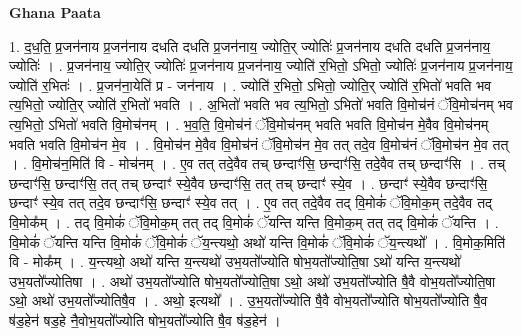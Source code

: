 \documentclass[17pt]{extarticle}
\begin{document}
\textbf{Ghana Paata } \newline

1. द॒ध॒ति॒ प्र॒जन॑नाय प्र॒जन॑नाय दधति दधति प्र॒जन॑नाय॒ ज्योति॒र् ज्योतिः॑ प्र॒जन॑नाय दधति दधति प्र॒जन॑नाय॒ ज्योतिः॑ । . प्र॒जन॑नाय॒ ज्योति॒र् ज्योतिः॑ प्र॒जन॑नाय प्र॒जन॑नाय॒ ज्योति॑ र॒भितो॒ ऽभितो॒ ज्योतिः॑ प्र॒जन॑नाय प्र॒जन॑नाय॒ ज्योति॑ र॒भितः॑ । . प्र॒जन॑ना॒येति॑ प्र - जन॑नाय । . ज्योति॑ र॒भितो॒ ऽभितो॒ ज्योति॒र् ज्योति॑ र॒भितो॑ भवति भव त्य॒भितो॒ ज्योति॒र् ज्योति॑ र॒भितो॑ भवति । . अ॒भितो॑ भवति भव त्य॒भितो॒ ऽभितो॑ भवति वि॒मोच॑नं ॅवि॒मोच॑नम् भव त्य॒भितो॒ ऽभितो॑ भवति वि॒मोच॑नम् । . भ॒व॒ति॒ वि॒मोच॑नं ॅवि॒मोच॑नम् भवति भवति वि॒मोच॑न मे॒वैव वि॒मोच॑नम् भवति भवति वि॒मोच॑न मे॒व । . वि॒मोच॑न मे॒वैव वि॒मोच॑नं ॅवि॒मोच॑न मे॒व तत् तदे॒व वि॒मोच॑नं ॅवि॒मोच॑न मे॒व तत् । . वि॒मोच॑न॒मिति॑ वि - मोच॑नम् । . ए॒व तत् तदे॒वैव तच् छन्दाꣳ॑सि॒ छन्दाꣳ॑सि॒ तदे॒वैव तच् छन्दाꣳ॑सि । . तच् छन्दाꣳ॑सि॒ छन्दाꣳ॑सि॒ तत् तच् छन्दाꣳ॑ स्ये॒वैव छन्दाꣳ॑सि॒ तत् तच् छन्दाꣳ॑ स्ये॒व । . छन्दाꣳ॑ स्ये॒वैव छन्दाꣳ॑सि॒ छन्दाꣳ॑ स्ये॒व तत् तदे॒व छन्दाꣳ॑सि॒ छन्दाꣳ॑ स्ये॒व तत् । . ए॒व तत् तदे॒वैव तद् वि॒मोकं॑ ॅवि॒मोक॒म् तदे॒वैव तद् वि॒मोक᳚म् । . तद् वि॒मोकं॑ ॅवि॒मोक॒म् तत् तद् वि॒मोकं॑ ॅयन्ति यन्ति वि॒मोक॒म् तत् तद् वि॒मोकं॑ ॅयन्ति । . वि॒मोकं॑ ॅयन्ति यन्ति वि॒मोकं॑ ॅवि॒मोकं॑ ॅय॒न्त्यथो॒ अथो॑ यन्ति वि॒मोकं॑ ॅवि॒मोकं॑ ॅय॒न्त्यथो᳚ । . वि॒मोक॒मिति॑ वि - मोक᳚म् । . य॒न्त्यथो॒ अथो॑ यन्ति य॒न्त्यथो॑ उभ॒यतो᳚ज्योति षोभ॒यतो᳚ज्योति॒षा ऽथो॑ यन्ति य॒न्त्यथो॑ उभ॒यतो᳚ज्योतिषा । . अथो॑ उभ॒यतो᳚ज्योति षोभ॒यतो᳚ज्योति॒षा ऽथो॒ अथो॑ उभ॒यतो᳚ज्योति षै॒वै वोभ॒यतो᳚ज्योति॒षा ऽथो॒ अथो॑ उभ॒यतो᳚ज्योतिषै॒व । . अथो॒ इत्यथो᳚ । . उ॒भ॒यतो᳚ज्योति षै॒वै वोभ॒यतो᳚ज्योति षोभ॒यतो᳚ज्योति षै॒व ष॑ड॒हेन॑ षड॒हे नै॒वोभ॒यतो᳚ज्योति
षोभ॒यतो᳚ज्योति षै॒व ष॑ड॒हेन॑ । \newline
\end{document}
